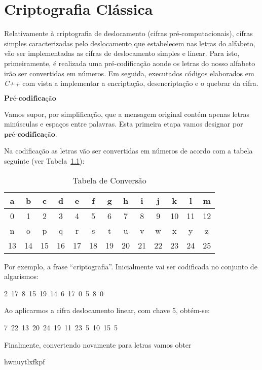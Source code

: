 \chapter{Criptografia Clássica}
\label{sec:CriptografiaClassica}


Relativamente à criptografia de deslocamento (cifras pré-computacionais), cifras simples 
caracterizadas pelo deslocamento que estabelecem nas letras do alfabeto, vão ser
implementadas as cifras de deslocamento simples e linear. Para isto,
primeiramente, é realizada uma pré-codificação aonde os letras do
nosso alfabeto irão ser convertidas em números. Em seguida, executados
códigos elaborados em \emph{C++ }com vista a implementar a encriptação,
desencriptação e o quebrar da cifra.


$\textbf{Pré-codificação}$

Vamos supor, por simplificação, que a mensagem original contém apenas letras minúsculas e espaços entre palavras. Esta primeira etapa vamos designar por $\textbf{pré-codificação}$. 

Na codificação as letras vão ser convertidas em números de acordo com a tabela seguinte (ver Tabela~\ref{tbl:TabelaConversao}):

\begin{table}[htbp!]
\centering
\begin{tabular}{|c|c|c|c|c|c|c|c|c|c|c|c|c|}
\hline
a & b & c & d & e & f & g & h & i & j & k & l & m \\
 \hline
 0 & 1 & 2 & 3 & 4 & 5 & 6 & 7 & 8 & 9 & 10 & 11 & 12 \\
 \hline\hline
n & o & p & q & r & s & t & u & v & w & x & y & z \\
 \hline
 13 & 14 & 15 & 16 & 17 & 18 & 19 & 20 & 21 & 22 & 23 & 24 & 25 \\
 \hline
 \end{tabular}
 \caption{Tabela de Conversão}
 \label{tbl:TabelaConversao}
\end{table}

Por exemplo, a frase ``criptografia''. Inicialmente vai ser codificada no conjunto de algarismos:
\begin{center}
2~17~8~15~19~14~6~17~0~5~8~0
\end{center}

Ao aplicarmos a cifra deslocamento linear, com chave 5, obtém-se:
\begin{center}
  7~22~13~20~24~19~11~23~5~10~15~5
\end{center}

Finalmente, convertendo novamente para letras vamos obter
\begin{center}
hwnuytlxfkpf
\end{center} 

